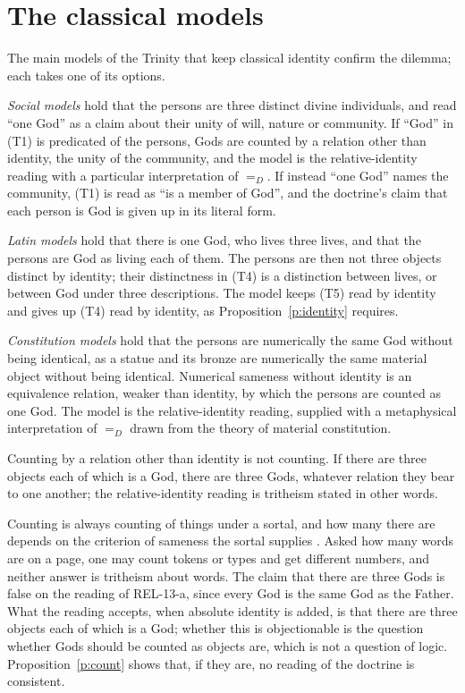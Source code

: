\documentclass{situationist-preprint}
\begin{document}
\section{The classical models}

The main models of the Trinity that keep classical identity confirm the dilemma; each takes one of its options.

\emph{Social models} \citep{Swinburne1994,Hasker2013} hold that the persons are three distinct divine individuals, and read \enquote{one God} as a claim about their unity of will, nature or community. If \enquote{God} in (T1) is predicated of the persons, Gods are counted by a relation other than identity, the unity of the community, and the model is the relative-identity reading with a particular interpretation of $=_D$. If instead \enquote{one God} names the community, (T1) is read as \enquote{is a member of God}, and the doctrine's claim that each person is God is given up in its literal form.

\emph{Latin models} \citep{Leftow2004} hold that there is one God, who lives three lives, and that the persons are God as living each of them. The persons are then not three objects distinct by identity; their distinctness in (T4) is a distinction between lives, or between God under three descriptions. The model keeps (T5) read by identity and gives up (T4) read by identity, as Proposition~\ref{p:identity} requires.

\emph{Constitution models} \citep{BrowerRea2005} hold that the persons are numerically the same God without being identical, as a statue and its bronze are numerically the same material object without being identical. Numerical sameness without identity is an equivalence relation, weaker than identity, by which the persons are counted as one God. The model is the relative-identity reading, supplied with a metaphysical interpretation of $=_D$ drawn from the theory of material constitution.

\begin{objection}
Counting by a relation other than identity is not counting. If there are three objects each of which is a God, there are three Gods, whatever relation they bear to one another; the relative-identity reading is tritheism stated in other words.
\end{objection}

\begin{reply}
Counting is always counting of things under a sortal, and how many there are depends on the criterion of sameness the sortal supplies \citep{Geach1962}. Asked how many words are on a page, one may count tokens or types and get different numbers, and neither answer is tritheism about words. The claim that there are three Gods is false on the reading of REL-13-a, since every God is the same God as the Father. What the reading accepts, when absolute identity is added, is that there are three objects each of which is a God; whether this is objectionable is the question whether Gods should be counted as objects are, which is not a question of logic. Proposition~\ref{p:count} shows that, if they are, no reading of the doctrine is consistent.
\end{reply}
\end{document}
